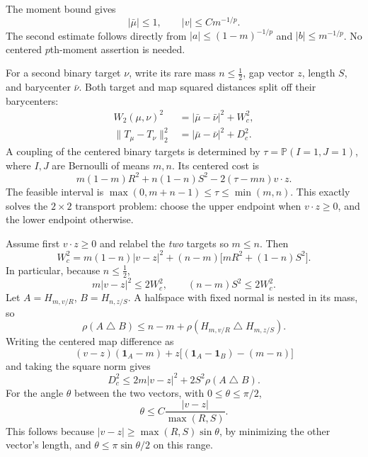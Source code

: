 The moment bound gives
\begin{equation}
  |\bar\mu|\le1,\qquad |v|\le Cm^{-1/p}.
  \tag{3.2}\label{eq:3.2}
\end{equation}
The second estimate follows directly from $|a|\le(1-m)^{-1/p}$ and $|b|\le m^{-1/p}$. No centered $p$th-moment assertion is needed.

For a second binary target $\nu$, write its rare mass $n\le\tfrac12$, gap vector $z$, length $S$, and barycenter $\bar\nu$. Both target and map squared distances split off their barycenters:
\begin{equation}
  \begin{aligned}
  W_2(\mu,\nu)^2&=|\bar\mu-\bar\nu|^2+W_c^2,\\
  \|T_\mu-T_\nu\|_2^2&=|\bar\mu-\bar\nu|^2+D_c^2.
  \end{aligned}
  \tag{3.3}\label{eq:3.3}
\end{equation}
A coupling of the centered binary targets is determined by $\tau=\mathbb P(I=1,J=1)$, where $I,J$ are Bernoulli of means $m,n$. Its centered cost is
\begin{equation}
  m(1-m)R^2+n(1-n)S^2-2(\tau-mn)v\cdot z.
  \tag{3.4}\label{eq:3.4}
\end{equation}
The feasible interval is $\max(0,m+n-1)\le\tau\le\min(m,n)$. This exactly solves the $2\times2$ transport problem: choose the upper endpoint when $v\cdot z\ge0$, and the lower endpoint otherwise.

Assume first $v\cdot z\ge0$ and relabel the \emph{two} targets so $m\le n$. Then
\begin{equation}
  W_c^2=m(1-n)|v-z|^2
    +(n-m)\bigl[mR^2+(1-n)S^2\bigr].
  \tag{3.5}\label{eq:3.5}
\end{equation}
In particular, because $n\le\tfrac12$,
\begin{equation}
  m|v-z|^2\le2W_c^2,
  \qquad (n-m)S^2\le2W_c^2.
  \tag{3.6}\label{eq:3.6}
\end{equation}
Let $A=H_{m,v/R}$, $B=H_{n,z/S}$. A halfspace with fixed normal is nested in its mass, so
\begin{equation}
  \rho(A\mathbin{\triangle}B)
  \le n-m+\rho(H_{m,v/R}\mathbin{\triangle}H_{m,z/S}).
  \tag{3.7}\label{eq:3.7}
\end{equation}
Writing the centered map difference as
\[
  (v-z)(\mathbf1_A-m)+z\bigl[(\mathbf1_A-\mathbf1_B)-(m-n)\bigr]
\]
and taking the square norm gives
\begin{equation}
  D_c^2\le2m|v-z|^2+2S^2\rho(A\mathbin{\triangle}B).
  \tag{3.8}\label{eq:3.8}
\end{equation}
For the angle $\theta$ between the two vectors, with $0\le\theta\le\pi/2$,
\begin{equation}
  \theta\le C\frac{|v-z|}{\max(R,S)}.
  \tag{3.9}\label{eq:3.9}
\end{equation}
This follows because $|v-z|\ge\max(R,S)\sin\theta$, by minimizing the other vector's length, and $\theta\le\pi\sin\theta/2$ on this range.

